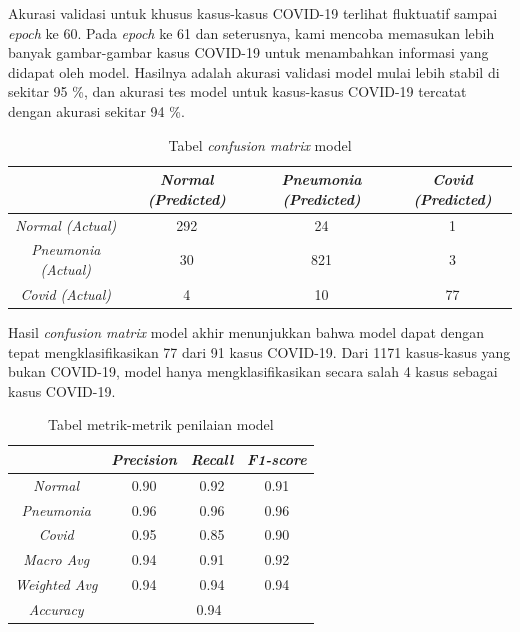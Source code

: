 \documentclass{article}
\begin{document}
   			\par Akurasi validasi untuk khusus kasus-kasus COVID-19 terlihat fluktuatif sampai \textit{epoch} ke 60. Pada \textit{epoch} ke 61 dan seterusnya, kami mencoba memasukan lebih banyak gambar-gambar kasus COVID-19 untuk menambahkan informasi yang didapat oleh model. Hasilnya adalah akurasi validasi model mulai lebih stabil di sekitar 95 \%, dan akurasi tes model untuk kasus-kasus COVID-19 tercatat dengan akurasi sekitar 94 \%.
   			
   			\begin{table}[H]
   			\begin{center}
   				\begin{tabular}{|c|c|c|c|}
   					\hline
   					& \textit{Normal (Predicted)} & \textit{Pneumonia (Predicted)} & \textit{Covid (Predicted)} \\
   					\hline
   					\textit{Normal (Actual)} & 292 & 24 & 1 \\
   					\hline
   					\textit{Pneumonia (Actual)} & 30 & 821 & 3 \\
   					\hline
   					\textit{Covid (Actual)} & 4 & 10 & 77 \\
   					\hline
   				\end{tabular}
   				\caption{Tabel \textit{confusion matrix} model}
   			\end{center}
   			\end{table}
   			
   			\par Hasil \textit{confusion matrix} model akhir menunjukkan bahwa model dapat dengan tepat mengklasifikasikan 77 dari 91 kasus COVID-19. Dari 1171 kasus-kasus yang bukan COVID-19, model hanya mengklasifikasikan secara salah 4 kasus sebagai kasus COVID-19. 
   			
   			\begin{table}[H]
   			\begin{center}
   				\begin{tabular}{|c|c|c|c|}
   					\hline
   					& \textit{Precision} & \textit{Recall} & \textit{F1-score} \\
   					\hline
   					\textit{Normal} & 0.90 & 0.92 & 0.91 \\
   					\hline
   					\textit{Pneumonia} & 0.96 & 0.96 & 0.96 \\
   					\hline
   					\textit{Covid} & 0.95 & 0.85 & 0.90 \\
   					\hline
   					\hline
   					\textit{Macro Avg} & 0.94 & 0.91 & 0.92 \\
   					\hline
   					\textit{Weighted Avg} & 0.94 & 0.94 & 0.94 \\
   					\hline
   					\hline
   					\textit{Accuracy} & \multicolumn{3}{|c|}{0.94} \\
   					\hline
   				\end{tabular}
   				\caption{Tabel metrik-metrik penilaian model}
   			\end{center}
   			\end{table}
   			
\end{document}
